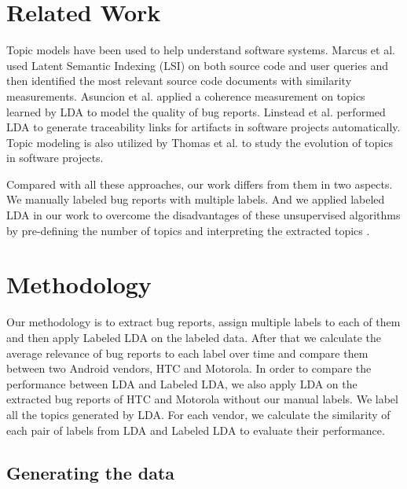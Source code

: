\documentclass[10pt, conference, compsocconf]{IEEEtran}
\begin{document}
\section{Related Work}
Topic models have been used to help understand software systems. Marcus et al.\cite{Marcus04aninformation} used Latent Semantic Indexing (LSI) on both source code and user queries and then identified the most relevant source code documents with similarity measurements. Asuncion et al.\cite{Asuncion:2010} applied a coherence measurement on topics learned by LDA to model the quality of bug reports. Linstead et al.\cite{Linstead:2009} performed LDA to generate traceability links for artifacts in software projects automatically. Topic modeling is also utilized by Thomas et al.\cite{Thomas:2011} to study the evolution of topics in software projects.

Compared with all these approaches, our work differs from them in two aspects. We manually labeled bug reports with multiple labels. And we applied labeled LDA in our work to overcome the disadvantages of these unsupervised algorithms by pre-defining the number of topics and interpreting the extracted topics \cite{Asuncion:2010}.

\section{Methodology}

Our methodology is to extract bug reports, assign multiple labels to each of them and then apply Labeled LDA on the labeled data. After that we calculate the average relevance of bug reports to each label over time\cite{Hindle} and compare them between two Android vendors, HTC and Motorola. In order to compare the performance between LDA and Labeled LDA, we also apply LDA on the extracted bug reports of HTC and Motorola without our manual labels. We label all the topics generated by LDA. For each vendor, we calculate the similarity of each pair of labels from LDA and Labeled LDA to evaluate their performance.

\subsection{Generating the data}

\end{document}
